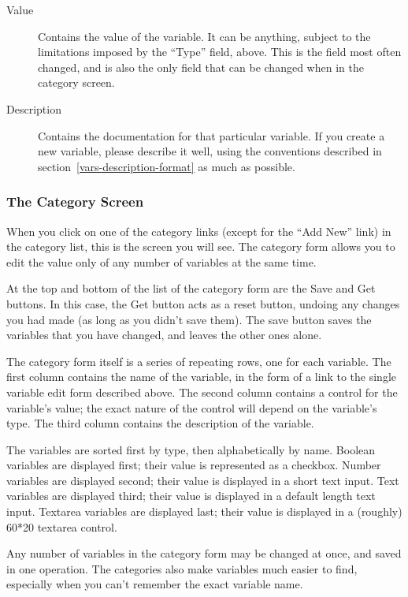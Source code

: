 \begin{description}
\item[Value] Contains the value of the variable.  It can be anything, subject to the limitations imposed by the ``Type'' field, above.  This is the field most often changed, and is also the only field that can be changed when in the category screen.
\item[Description] Contains the documentation for that particular variable.  If you create a new variable, please describe it well, using the conventions described in section~\ref{vars-description-format} as much as possible.
\end{description}

\subsubsection{The Category Screen}

When you click on one of the category links (except for the ``Add New'' link) in the category list, this is the screen you will see.  The category form allows you to edit the value only of any number of variables at the same time.

At the top and bottom of the list of the category form are the Save and Get buttons.  In this case, the Get button acts as a reset button, undoing any changes you had made (as long as you didn't save them).  The save button saves the variables that you have changed, and leaves the other ones alone.

The category form itself is a series of repeating rows, one for each variable.  The first column contains the name of the variable, in the form of a link to the single variable edit form described above.  The second column contains a control for the variable's value; the exact nature of the control will depend on the variable's type.  The third column contains the description of the variable.

The variables are sorted first by type, then alphabetically by name.  Boolean variables are displayed first; their value is represented as a checkbox.  Number variables are displayed second; their value is displayed in a short text input.  Text variables are displayed third; their value is displayed in a default length text input.  Textarea variables are displayed last; their value is displayed in a (roughly) 60*20 textarea control.

Any number of variables in the category form may be changed at once, and saved in one operation.  The categories also make variables much easier to find, especially when you can't remember the exact variable name.

